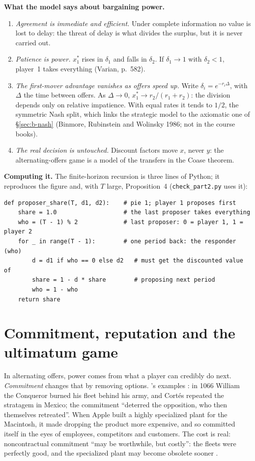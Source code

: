 \textbf{What the model says about bargaining power.}
\begin{enumerate}
  \item \emph{Agreement is immediate and efficient.} Under complete information no value is lost
  to delay: the threat of delay is what divides the surplus, but it is never carried out.
  \item \emph{Patience is power.} $x_1^*$ rises in $\delta_1$ and falls in $\delta_2$. If
  $\delta_1 \to 1$ with $\delta_2 < 1$, player~1 takes everything (Varian, p.~582).
  \item \emph{The first-mover advantage vanishes as offers speed up.} Write
  $\delta_i = e^{-r_i \Delta}$, with $\Delta$ the time between offers. As $\Delta \to 0$,
  $x_1^* \to r_2/(r_1 + r_2)$: the division depends only on relative impatience. With equal
  rates it tends to $1/2$, the symmetric Nash split, which links the strategic model to the
  axiomatic one of \S\ref{sec:b-nash} (Binmore, Rubinstein and Wolinsky 1986; not in the course
  books).
  \item \emph{The real decision is untouched.} Discount factors move $x$, never $y$: the
  alternating-offers game is a model of the transfers in the Coase theorem.
\end{enumerate}

\textbf{Computing it.} The finite-horizon recursion is three lines of Python; it reproduces the
figure and, with $T$ large, Proposition~4 (\texttt{check\_part2.py} uses it):
\begin{verbatim}
def proposer_share(T, d1, d2):    # pie 1; player 1 proposes first
    share = 1.0                   # the last proposer takes everything
    who = (T - 1) % 2             # last proposer: 0 = player 1, 1 = player 2
    for _ in range(T - 1):        # one period back: the responder (who)
        d = d1 if who == 0 else d2   # must get the discounted value of
        share = 1 - d * share        # proposing next period
        who = 1 - who
    return share
\end{verbatim}

\section{Commitment, reputation and the ultimatum game}\label{sec:b-commit}

In alternating offers, power comes from what a player can credibly do next. \emph{Commitment}
changes that by removing options. \MR's examples : in 1066 William the Conqueror burned
his fleet behind his army, and Cort\'es repeated the stratagem in Mexico; the commitment ``deterred
the opposition, who then themselves retreated''. When Apple built a highly specialized plant for
the Macintosh, it made dropping the product more expensive, and so committed itself in the eyes
of employees, competitors and customers. The cost is real: noncontractual commitment ``may be
worthwhile, but costly'': the fleets were perfectly good, and the specialized plant may become
obsolete sooner .

